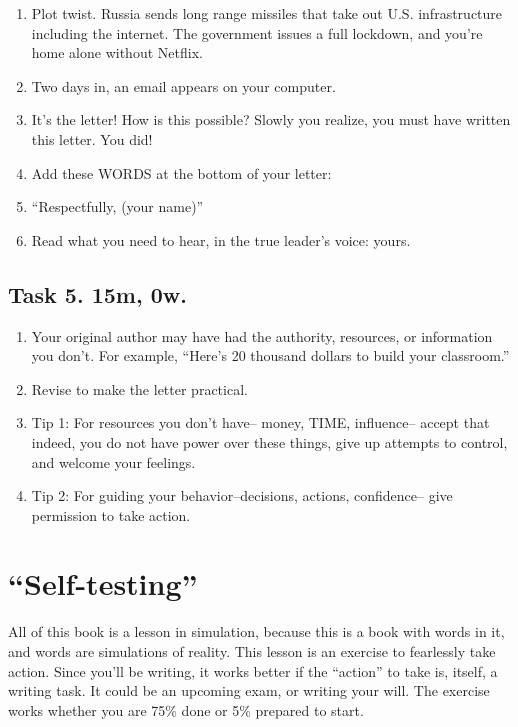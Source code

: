 \documentclass[
]{book}
\providecommand{\tightlist}{%
  \setlength{\itemsep}{0pt}\setlength{\parskip}{0pt}}
\begin{document}
\begin{enumerate}
\def\labelenumi{\arabic{enumi}.}
\setcounter{enumi}{4}
\tightlist
\item
  Plot twist. Russia sends long range missiles that take out U.S.
  infrastructure including the internet. The government issues a full
  lockdown, and you're home alone without Netflix.\\
\item
  Two days in, an email appears on your computer.
\item
  It's the letter! How is this possible? Slowly you realize, you must
  have written this letter. You did!
\item
  Add these WORDS at the bottom of your letter:
\item
  ``Respectfully, (your name)''
\item
  Read what you need to hear, in the true leader's voice: yours.
\end{enumerate}

\hypertarget{task-5.-15m-0w.}{%
\section{Task 5. 15m, 0w.}\label{task-5.-15m-0w.}}

\begin{enumerate}
\def\labelenumi{\arabic{enumi}.}
\setcounter{enumi}{10}
\tightlist
\item
  Your original author may have had the authority, resources, or
  information you don't. For example, ``Here's 20 thousand dollars to
  build your classroom.''
\item
  Revise to make the letter practical.
\item
  Tip 1: For resources you don't have-- money, TIME, influence--
  accept that indeed, you do not have power over these things, give up
  attempts to control, and welcome your feelings.
\item
  Tip 2: For guiding your behavior--decisions, actions, confidence--
  give permission to take action.
\end{enumerate}

\hypertarget{self-testing}{%
\chapter{``Self-testing''}\label{self-testing}}

All of this book is a lesson in simulation,
because this is a book with words in it,
and words are simulations of reality.
This lesson is an exercise to fearlessly
take action. Since you'll be writing,
it works better if the ``action'' to take is,
itself, a writing task.
It could be an upcoming exam, or writing your will.
The exercise works whether you are
75\% done or 5\% prepared to start.
\end{document}

